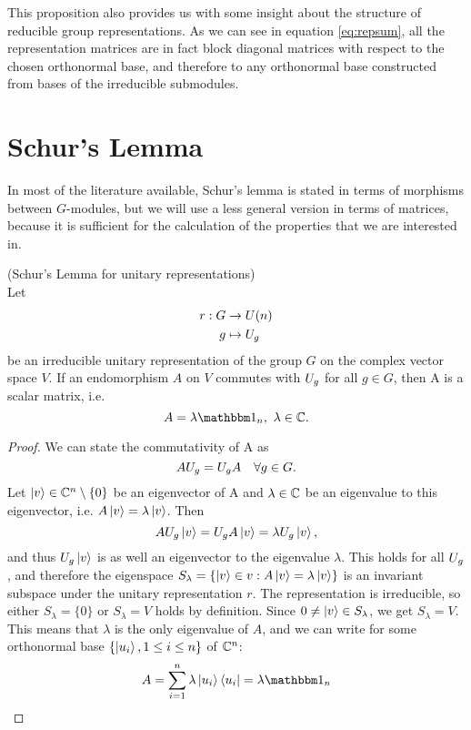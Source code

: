 \documentclass[a4paper,11pt, BCOR=4mm, DIV=12, pagesize]{scrartcl}
\begin{document}
This proposition also provides us with some insight about the structure of 
reducible group representations. As we can see in equation \ref{eq:repsum}, all 
the representation matrices are in fact block diagonal matrices with respect to 
the chosen orthonormal base, and therefore to any orthonormal base constructed 
from bases of the irreducible submodules.


\section{Schur's Lemma}
In most of the literature  available, Schur's lemma is stated in terms of 
morphisms between $G$-modules, but we will use a less general version in 
terms of matrices, because it is sufficient for the calculation of the 
properties that we are interested in. 
\begin{thm}(Schur's Lemma for unitary representations)\\
 Let
 \begin{align*}
  r: G&\to U(n)\\
  g&\mapsto U_{g}
 \end{align*}
 be an irreducible unitary 
 representation of the group $G$ on the complex vector space $V$. If an 
endomorphism $A$ on $V$ commutes with  $U_{g}$ 
 for all $g\in G$, then A is a scalar matrix, i.e. 
 \begin{equation}
  A = \lambda \ind_n,\ \lambda\in\C.
 \end{equation}
\end{thm}
\begin{proof}
 We can state the commutativity of A as 
 \begin{equation*}
  AU_{g} = U_{g}A\quad \forall g\in G.
 \end{equation*}
 Let $\ket{v}\in\mathbb{C}^n\setminus\{0\}$ be  
an eigenvector of A and $\lambda\in\mathbb{C}$ be an eigenvalue to this eigenvector, 
i.e. $A\ket{v} = \lambda\ket{v}$. 
Then 
 \begin{equation*}
  AU_{g}\ket{v} = U_{g}A\ket{v} = \lambda U_{g}\ket{v},
 \end{equation*}
 and thus $U_{g}\ket{v}$ is as well an eigenvector to the eigenvalue 
 $\lambda$. This holds for all $U_{g}$, and therefore the eigenspace 
 $S_\lambda = \left\{\ket{v}\in v: A\ket{v} = \lambda\ket{v} \right\}$ is 
 an invariant subspace under the unitary representation $r$. The representation 
 is irreducible, so either $S_\lambda = \{0\}$ 
 or $S_\lambda = V$ holds by definition. Since $0\neq\ket{v}\in S_\lambda$, 
we get 
$S_\lambda  = V$. This means that $\lambda$ is the only eigenvalue of $A$, 
and we can  write for some orthonormal base $\left\{\ket{u_i}, 1\leq i\leq 
n\right\}$ of $\mathbb{C}^n$:
 \begin{equation*}
  A = \summe{i}{1}{n} \lambda \ket{u_i} \bra{u_i} = \lambda\ind_n
 \end{equation*}






\end{proof}
\end{document}
